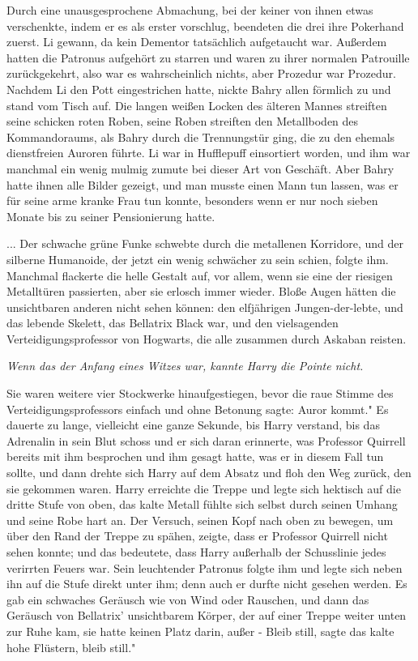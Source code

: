 Durch eine unausgesprochene Abmachung, bei der keiner von ihnen etwas
verschenkte, indem er es als erster vorschlug, beendeten die drei ihre Pokerhand
zuerst. Li gewann, da kein Dementor tatsächlich aufgetaucht war. Außerdem hatten
die Patronus aufgehört zu starren und waren zu ihrer normalen Patrouille
zurückgekehrt, also war es wahrscheinlich nichts, aber Prozedur war Prozedur.
Nachdem Li den Pott eingestrichen hatte, nickte Bahry allen förmlich zu und
stand vom Tisch auf. Die langen weißen Locken des älteren Mannes streiften seine
schicken roten Roben, seine Roben streiften den Metallboden des Kommandoraums,
als Bahry durch die Trennungstür ging, die zu den ehemals dienstfreien Auroren
führte. Li war in Hufflepuff einsortiert worden, und ihm war manchmal ein wenig
mulmig zumute bei dieser Art von Geschäft. Aber Bahry hatte ihnen alle Bilder
gezeigt, und man musste einen Mann tun lassen, was er für seine arme kranke Frau
tun konnte, besonders wenn er nur noch sieben Monate bis zu seiner Pensionierung
hatte.

... Der schwache grüne Funke schwebte durch die metallenen Korridore, und der
silberne Humanoide, der jetzt ein wenig schwächer zu sein schien, folgte ihm.
Manchmal flackerte die helle Gestalt auf, vor allem, wenn sie eine der riesigen
Metalltüren passierten, aber sie erlosch immer wieder. Bloße Augen hätten die
unsichtbaren anderen nicht sehen können: den elfjährigen Jungen-der-lebte, und
das lebende Skelett, das Bellatrix Black war, und den vielsagenden
Verteidigungsprofessor von Hogwarts, die alle zusammen durch Askaban reisten.

\emph{ Wenn das der Anfang eines Witzes war, kannte Harry die Pointe nicht.}

Sie waren weitere vier Stockwerke hinaufgestiegen, bevor die raue Stimme des
Verteidigungsprofessors einfach und ohne Betonung sagte: \glqq Auror kommt." Es
dauerte zu lange, vielleicht eine ganze Sekunde, bis Harry verstand, bis das
Adrenalin in sein Blut schoss und er sich daran erinnerte, was Professor
Quirrell bereits mit ihm besprochen und ihm gesagt hatte, was er in diesem Fall
tun sollte, und dann drehte sich Harry auf dem Absatz und floh den Weg zurück,
den sie gekommen waren. Harry erreichte die Treppe und legte sich hektisch auf
die dritte Stufe von oben, das kalte Metall fühlte sich selbst durch seinen
Umhang und seine Robe hart an. Der Versuch, seinen Kopf nach oben zu bewegen, um
über den Rand der Treppe zu spähen, zeigte, dass er Professor Quirrell nicht
sehen konnte; und das bedeutete, dass Harry außerhalb der Schusslinie jedes
verirrten Feuers war. Sein leuchtender Patronus folgte ihm und legte sich neben
ihn auf die Stufe direkt unter ihm; denn auch er durfte nicht gesehen werden. Es
gab ein schwaches Geräusch wie von Wind oder Rauschen, und dann das Geräusch von
Bellatrix' unsichtbarem Körper, der auf einer Treppe weiter unten zur Ruhe kam,
sie hatte keinen Platz darin, außer - \glqq Bleib still\grqq{}, sagte das kalte
hohe Flüstern, \glqq bleib still."

